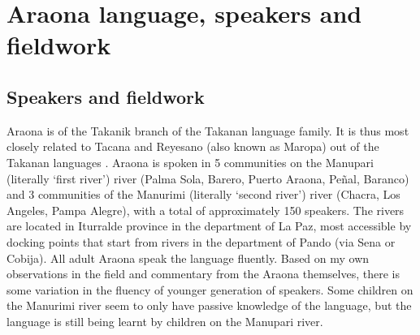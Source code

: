 \documentclass[output=paper,hidelinks]{langscibook}
\begin{document}

\section{Araona language, speakers and fieldwork} %
\label{araona:sec:language}
\largerpage[-1]
\subsection{Speakers and fieldwork}

Araona is of the Takanik branch of the Takanan language family. It is thus most closely related to Tacana and Reyesano (also known as Maropa) out of the Takanan languages \citep{girard:1971}. Araona is spoken in 5 communities on the Manupari (literally `first river') river (Palma Sola, Barero, Puerto Araona, Peñal, Baranco) and 3 communities of the Manurimi (literally `second river') river (Chacra, Los Angeles, Pampa Alegre), with a total of approximately 150 speakers. The rivers are located in Iturralde province in the department of La Paz, most accessible by docking points that start from rivers in the department of Pando (via Sena or Cobija). All adult Araona speak the language fluently. Based on my own observations in the field and commentary from the Araona themselves, there is some variation in the fluency of younger generation of speakers. Some children on the Manurimi river seem to only have passive knowledge of the language, but the language is still being learnt by children on the Manupari river.
\end{document}
